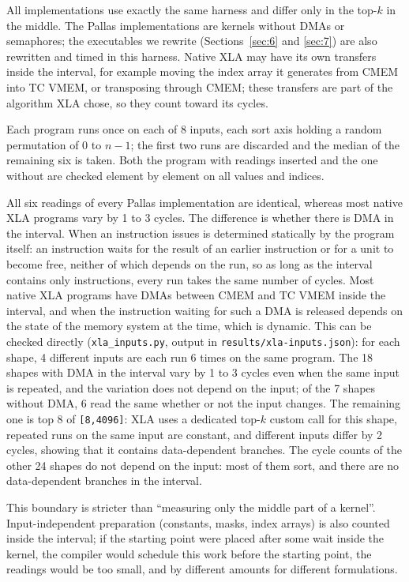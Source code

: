 \documentclass[sigconf,nonacm,balance=false]{acmart}
\newcommand{\code}[1]{\texttt{#1}}
\begin{document}
All implementations use exactly the same harness and differ only in the top-$k$ in the middle. The Pallas implementations are kernels without DMAs or semaphores; the executables we rewrite (Sections~\ref{sec:6} and \ref{sec:7}) are also rewritten and timed in this harness. Native XLA may have its own transfers inside the interval, for example moving the index array it generates from CMEM into TC VMEM, or transposing through CMEM; these transfers are part of the algorithm XLA chose, so they count toward its cycles.

Each program runs once on each of 8 inputs, each sort axis holding a random permutation of 0 to $n - 1$; the first two runs are discarded and the median of the remaining six is taken. Both the program with readings inserted and the one without are checked element by element on all values and indices.

All six readings of every Pallas implementation are identical, whereas most native XLA programs vary by 1 to 3 cycles. The difference is whether there is DMA in the interval. When an instruction issues is determined statically by the program itself: an instruction waits for the result of an earlier instruction or for a unit to become free, neither of which depends on the run, so as long as the interval contains only instructions, every run takes the same number of cycles. Most native XLA programs have DMAs between CMEM and TC VMEM inside the interval, and when the instruction waiting for such a DMA is released depends on the state of the memory system at the time, which is dynamic. This can be checked directly (\code{xla\_\allowbreak{}inputs.\allowbreak{}py}, output in \code{results/\allowbreak{}xla-inputs.\allowbreak{}json}): for each shape, 4 different inputs are each run 6 times on the same program. The 18 shapes with DMA in the interval vary by 1 to 3 cycles even when the same input is repeated, and the variation does not depend on the input; of the 7 shapes without DMA, 6 read the same whether or not the input changes. The remaining one is top 8 of \code{[8,\allowbreak{}4096]}: XLA uses a dedicated top-$k$ custom call for this shape, repeated runs on the same input are constant, and different inputs differ by 2 cycles, showing that it contains data-dependent branches. The cycle counts of the other 24 shapes do not depend on the input: most of them sort, and there are no data-dependent branches in the interval.

This boundary is stricter than ``measuring only the middle part of a kernel''. Input-independent preparation (constants, masks, index arrays) is also counted inside the interval; if the starting point were placed after some wait inside the kernel, the compiler would schedule this work before the starting point, the readings would be too small, and by different amounts for different formulations.
\end{document}
